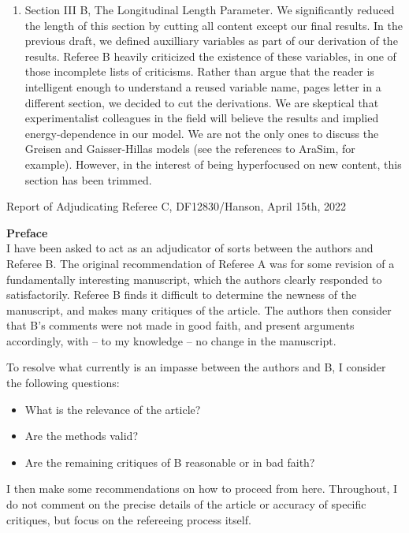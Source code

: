 \documentclass[12pt]{article}
\begin{document}
\begin{enumerate}
\item Section III B, The Longitudinal Length Parameter.  We significantly reduced the length of this section by cutting all content except our final results.  In the previous draft, we defined auxilliary variables as part of our derivation of the results.  Referee B heavily criticized the existence of these variables, in one of those incomplete lists of criticisms.  Rather than argue that the reader is intelligent enough to understand a reused variable name, pages letter in a different section, we decided to cut the derivations.  We are skeptical that experimentalist colleagues in the field will believe the results and implied energy-dependence in our model.  We are not the only ones to discuss the Greisen and Gaisser-Hillas models (see the references to AraSim, for example).  However, in the interest of being hyperfocused on new content, this section has been trimmed.

\end{enumerate}

Report of Adjudicating Referee C, DF12830/Hanson, April 15th, 2022 \\ \vspace{0.25cm}
\hrulefill

\textbf{Preface} \\ 

I have been asked to act as an adjudicator of sorts between the authors and Referee B. The
original recommendation of Referee A was for some revision of a fundamentally interesting
manuscript, which the authors clearly responded to satisfactorily. Referee B finds it difficult
to determine the newness of the manuscript, and makes many critiques of the article. The
authors then consider that B’s comments were not made in good faith, and present
arguments accordingly, with – to my knowledge – no change in the manuscript.

To resolve what currently is an impasse between the authors and B, I consider the following
questions:

\begin{itemize}
\item What is the relevance of the article?
\item Are the methods valid?
\item Are the remaining critiques of B reasonable or in bad faith?
\end{itemize}

I then make some recommendations on how to proceed from here. Throughout, I do not comment on the precise details of the article or accuracy of specific critiques, but focus on the refereeing process itself. \\
\end{document}
